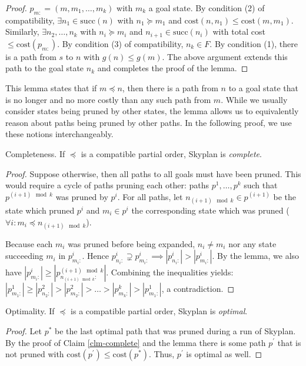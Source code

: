\documentclass[letterpaper]{article}
\theoremstyle{plain} \newtheorem{theorem}{Theorem} \newtheorem{proposition}{Proposition} \newtheorem{lemma}{Lemma}
\theoremstyle{definition} \newtheorem{definition}{Definition} \newtheorem{conjecture}{Conjecture} \newtheorem*{example}{Example}
\theoremstyle{remark} \newtheorem*{remark}{Remark} \newtheorem*{note}{Note} \newtheorem{case}{Case}
\begin{document}
\begin{proof}
$p_{m:}=(m,m_{1},\dots,m_{k})$ with $m_{k}$ a goal state.
By condition (2) of compatibility, $\exists n_{1} \in \mathrm{succ}(n)$ 
with $n_{1} \succeq m_{1}$ and $\mathrm{cost}(n,n_{1}) \leq \mathrm{cost}(m,m_{1})$. 
Similarly, $\exists n_{2},\dots,n_{k}$ with 
$n_{i} \succeq m_{i}$ and $n_{i+1} \in \mathrm{succ}(n_{i})$ with 
total cost $\leq \mathrm{cost}(p_{m:})$.
By condition (3) of compatibility, $n_{k} \in F$. By condition (1),
there is a path from $s$ to $n$ with $g(n) \leq g(m)$. The above argument extends this path
to the goal state $n_{k}$ and completes the proof of the lemma.
\end{proof}

This lemma states that if $m \preceq n$, then there is a path from $n$ to a goal
state that is no longer and no more costly than any such path from $m$.
While we usually consider states being pruned by other states, the lemma
allows us to equivalently reason about paths being pruned by other paths.
In the following proof, we use these notions interchangeably.


\begin{claim}{Completeness.}\label{clm-complete}
   If $\preceq$ is a compatible partial order, Skyplan
is \emph{complete}.
\end{claim}
\begin{proof}
Suppose otherwise, then all paths to all goals must
have been pruned. This would require a cycle of paths pruning each other: 
paths $p^{1},\dots,p^{k}$ such that $p^{ (i+1) \mod k}$ was pruned by $p^{i }$.
For all paths, let $n_{(i+1) \mod k} \in p^{(i+1)}$ be the state which pruned $p^{i}$ and
$m_{i} \in p^{i}$ the corresponding state which was pruned 
($\forall i: m_{i} \preceq n_{(i+1) \mod k}$).

Because each $m_{i}$ was pruned before being expanded,
$n_{i} \neq m_{i}$ nor any state succeeding $m_{i}$ in $p^{i}_{m_{i}:}$.
Hence $p^{i}_{n_{i}:} \supsetneq p^{i}_{m_{i}:} \implies |p^{i}_{n_{i}:}| > |p^{i}_{m_{i}:}|$.
By the lemma, we also have %
 $|p^{i}_{m_{i}:}| \geq |p^{(i+1)\mod k}_{n_{(i+1)\mod k}:}|$. Combining the
inequalities yields: $|p^{1}_{m_{1}:}| \geq |p^{2}_{n_{2}:}| > |p^{2}_{m_{2}:}| > \dots > |p^{k}_{m_{k}:}| > |p^{1}_{m_{1}:}|$, 
a contradiction.
\end{proof}
  
\begin{claim}{Optimality.}\label{clm-optimal}
   If $\preceq$ is a compatible partial order, Skyplan
is \emph{optimal}.
\end{claim}
\begin{proof} 
Let $p^{*}$ be the last optimal path that was pruned during a run of Skyplan. 
By the proof of Claim \ref{clm-complete} and the lemma 
there is some path $p^\prime$ that is not pruned with
$\mathrm{cost}(p^\prime) \leq \mathrm{cost}(p^{*})$.
Thus, $p^\prime$ is optimal as well.
\end{proof}
\end{document}
